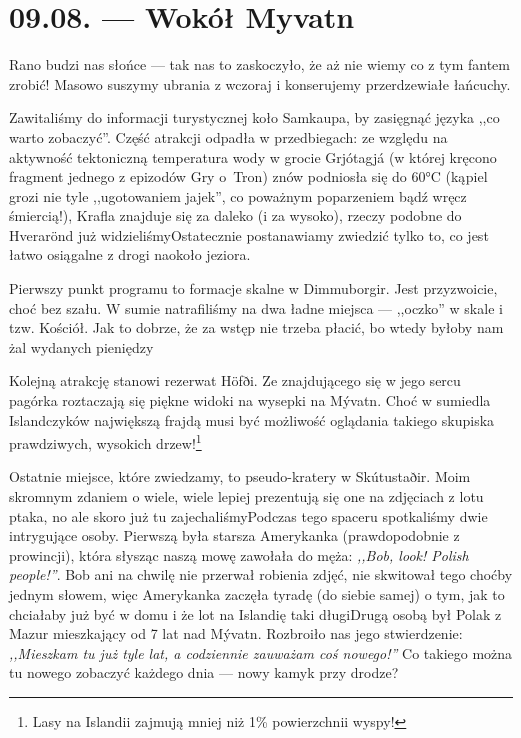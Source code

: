 \chapter*{09.08. --- Wokół Myvatn}

Rano budzi nas słońce --- tak nas to zaskoczyło, że aż nie wiemy co z tym fantem zrobić! Masowo suszymy ubrania z wczoraj i konserujemy przerdzewiałe łańcuchy.

Zawitaliśmy do informacji turystycznej koło Samkaupa, by zasięgnąć języka ,,co warto zobaczyć''. Część atrakcji odpadła w przedbiegach: ze względu na aktywność tektoniczną temperatura wody w grocie Grjótagjá (w której kręcono fragment jednego z epizodów Gry o~Tron) znów podniosła się do 60°C (kąpiel grozi nie tyle ,,ugotowaniem jajek'', co poważnym poparzeniem bądź wręcz śmiercią!), Krafla znajduje się za daleko (i za wysoko\textellipsis), rzeczy podobne do Hverarönd już widzieliśmy\textellipsis Ostatecznie postanawiamy zwiedzić tylko to, co jest łatwo osiągalne z drogi naokoło jeziora.

Pierwszy punkt programu to formacje skalne w Dimmuborgir. Jest przyzwoicie, choć bez szału. W sumie natrafiliśmy na dwa ładne miejsca --- ,,oczko'' w skale i tzw. Kościół. Jak to dobrze, że za wstęp nie trzeba płacić, bo wtedy byłoby nam żal wydanych pieniędzy \wink


Kolejną atrakcję stanowi rezerwat Höfði. Ze znajdującego się w jego sercu pagórka roztaczają się piękne widoki na wysepki na Mývatn. Choć w sumie\textellipsis dla Islandczyków największą frajdą musi być możliwość oglądania takiego skupiska prawdziwych, wysokich drzew!\footnote{Lasy na Islandii zajmują mniej niż 1\% powierzchnii wyspy!}


Ostatnie miejsce, które zwiedzamy, to pseudo-kratery w Skútustaðir. Moim skromnym zdaniem o wiele, wiele lepiej prezentują się one na zdjęciach z lotu ptaka, no ale skoro już tu zajechaliśmy\textellipsis Podczas tego spaceru spotkaliśmy dwie intrygujące osoby. Pierwszą była starsza Amerykanka (prawdopodobnie z prowincji), która słysząc naszą mowę zawołała do męża: \emph{,,Bob, look! Polish people!''}. Bob ani na chwilę nie przerwał robienia zdjęć, nie skwitował tego choćby jednym słowem, więc Amerykanka zaczęła tyradę (do siebie samej) o tym, jak to chciałaby już być w domu i że lot na Islandię taki długi\textellipsis Drugą osobą był Polak z Mazur mieszkający od 7 lat nad Mývatn. Rozbroiło nas jego stwierdzenie: \emph{,,Mieszkam tu już tyle lat, a codziennie zauważam coś nowego!''} Co takiego można tu nowego zobaczyć każdego dnia --- nowy kamyk przy drodze?


